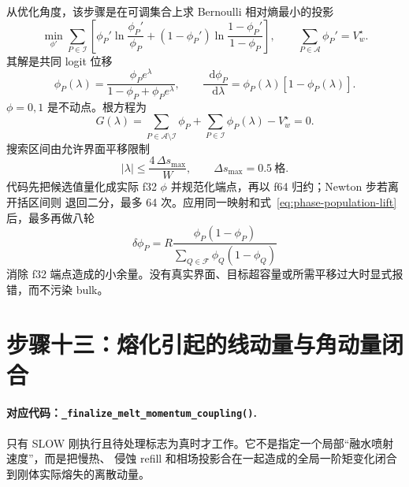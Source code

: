\documentclass[UTF8,zihao=-4]{ctexart}
\newcommand{\dd}{\mathop{}\!\mathrm d}
\newcommand{\code}[1]{\texttt{#1}}
\newcommand{\stepname}[1]{\paragraph{对应代码：\code{#1}.}}
\numberwithin{equation}{section}
\begin{document}
从优化角度，该步骤是在可调集合上求 Bernoulli 相对熵最小的投影
\begin{equation}
 \min_{\phi'}\sum_{P\in\mathcal I}
 \left[\phi_P'\ln\frac{\phi_P'}{\phi_P}
 +(1-\phi_P')\ln\frac{1-\phi_P'}{1-\phi_P}\right],
 \qquad
 \sum_{P\in\mathcal A}\phi_P'=V_w^\star .
\end{equation}
其解是共同 logit 位移
\begin{equation}
  \phi_P(\lambda)=\frac{\phi_Pe^\lambda}
  {1-\phi_P+\phi_Pe^\lambda},
  \qquad
  \frac{\dd\phi_P}{\dd\lambda}=\phi_P(\lambda)[1-\phi_P(\lambda)].
  \label{eq:logit-map}
\end{equation}
$\phi=0,1$ 是不动点。根方程为
\begin{equation}
  G(\lambda)=\sum_{P\in\mathcal A\setminus\mathcal I}\phi_P
  +\sum_{P\in\mathcal I}\phi_P(\lambda)-V_w^\star=0.
  \label{eq:water-root}
\end{equation}
搜索区间由允许界面平移限制
\begin{equation}
  |\lambda|\le\frac{4\,\Delta s_{\max}}{W},
  \qquad \Delta s_{\max}=0.5\ \text{格}.
\end{equation}
代码先把候选值量化成实际 f32 $\phi$ 并规范化端点，再以 f64 归约；Newton 步若离开括区间则
退回二分，最多 64 次。应用同一映射和式~\eqref{eq:phase-population-lift} 后，最多再做八轮
\begin{equation}
  \delta\phi_P=R\frac{\phi_P(1-\phi_P)}
  {\sum_{Q\in\mathcal F}\phi_Q(1-\phi_Q)}
  \label{eq:phase-residual-correction}
\end{equation}
消除 f32 端点造成的小余量。没有真实界面、目标超容量或所需平移过大时显式报错，而不污染 bulk。

\section{步骤十三：熔化引起的线动量与角动量闭合}

\stepname{\_finalize\_melt\_momentum\_coupling()}
只有 SLOW 刚执行且待处理标志为真时才工作。它不是指定一个局部“融水喷射速度”，而是把慢热、
侵蚀 refill 和相场投影合在一起造成的全局一阶矩变化闭合到刚体实际熔失的离散动量。
\end{document}

